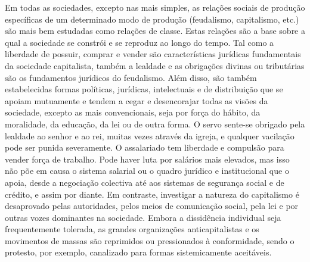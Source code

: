  \par 
Em todas as sociedades, excepto nas mais simples, as relações sociais de produção específicas de um determinado modo de produção (feudalismo, capitalismo, etc.) são mais bem estudadas como relações de classe. Estas relações são a base sobre a qual a sociedade se constrói e se reproduz ao longo do tempo. Tal como a liberdade de possuir, comprar e vender são características jurídicas fundamentais da sociedade capitalista, também a lealdade e as obrigações divinas ou tributárias são os fundamentos jurídicos do feudalismo. Além disso, são também estabelecidas formas políticas, jurídicas, intelectuais e de distribuição que se apoiam mutuamente e tendem a cegar e desencorajar todas as visões da sociedade, excepto as mais convencionais, seja por força do hábito, da moralidade, da educação, da lei ou de outra forma. O servo sente-se obrigado pela lealdade ao senhor e ao rei, muitas vezes através da igreja, e qualquer vacilação pode ser punida severamente. O assalariado tem liberdade e compulsão para vender força de trabalho. Pode haver luta por salários mais elevados, mas isso não põe em causa o sistema salarial ou o quadro jurídico e institucional que o apoia, desde a negociação colectiva até aos sistemas de segurança social e de crédito, e assim por diante. Em contraste, investigar a natureza do capitalismo é desaprovado pelas autoridades, pelos meios de comunicação social, pela lei e por outras vozes dominantes na sociedade. Embora a dissidência individual seja frequentemente tolerada, as grandes organizações anticapitalistas e os movimentos de massas são reprimidos ou pressionados à conformidade, sendo o protesto, por exemplo, canalizado para formas sistemicamente aceitáveis.
 \par 
